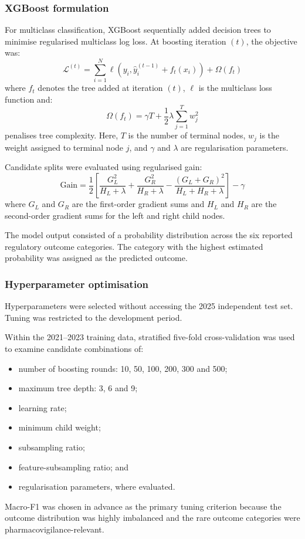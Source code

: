 \documentclass[10pt]{article}
\begin{document}
\subsubsection{XGBoost formulation}
For multiclass classification, XGBoost sequentially added decision trees to minimise regularised multiclass log loss. At boosting iteration $(t)$, the objective was:
\begin{equation}
\mathcal{L}^{(t)} = \sum_{i=1}^{N} \ell\left(y_i, \hat{y}_i^{(t-1)} + f_t(x_i)\right) + \Omega(f_t)
\end{equation}
where $f_t$ denotes the tree added at iteration $(t)$, $\ell$ is the multiclass loss function and:
\begin{equation}
\Omega(f_t) = \gamma T + \frac{1}{2}\lambda\sum_{j=1}^{T} w_j^2
\end{equation}
penalises tree complexity. Here, $T$ is the number of terminal nodes, $w_j$ is the weight assigned to terminal node $j$, and $\gamma$ and $\lambda$ are regularisation parameters.

Candidate splits were evaluated using regularised gain:
\begin{equation}
\text{Gain} = \frac{1}{2}\left[\frac{G_L^2}{H_L + \lambda} + \frac{G_R^2}{H_R + \lambda} - \frac{(G_L + G_R)^2}{H_L + H_R + \lambda}\right] - \gamma
\end{equation}
where $G_L$ and $G_R$ are the first-order gradient sums and $H_L$ and $H_R$ are the second-order gradient sums for the left and right child nodes.

The model output consisted of a probability distribution across the six reported regulatory outcome categories. The category with the highest estimated probability was assigned as the predicted outcome.

\subsubsection{Hyperparameter optimisation}
Hyperparameters were selected without accessing the 2025 independent test set. Tuning was restricted to the development period.

Within the 2021--2023 training data, stratified five-fold cross-validation was used to examine candidate combinations of:
\begin{itemize}
\item number of boosting rounds: 10, 50, 100, 200, 300 and 500;
\item maximum tree depth: 3, 6 and 9;
\item learning rate;
\item minimum child weight;
\item subsampling ratio;
\item feature-subsampling ratio; and
\item regularisation parameters, where evaluated.
\end{itemize}
Macro-F1 was chosen in advance as the primary tuning criterion because the outcome distribution was highly imbalanced and the rare outcome categories were pharmacovigilance-relevant.
\end{document}
